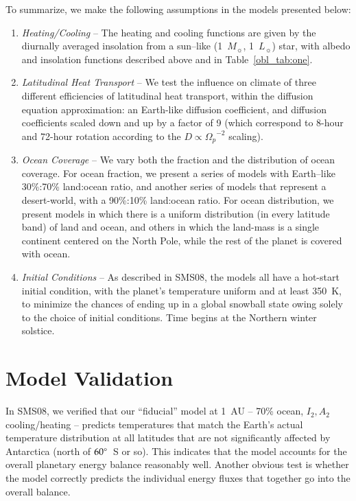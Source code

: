 To summarize, we make the following assumptions in the models
presented below:
\begin{enumerate}
 \item {\it Heating/Cooling} -- The heating and cooling functions are
    given by the diurnally averaged insolation from a sun--like
    (1~$M_\sun$, 1~$L_\sun$) star, with albedo and insolation
    functions described above and in Table~\ref{obl_tab:one}.
 \item {\it Latitudinal Heat Transport} -- We test the influence on
    climate of three different efficiencies of latitudinal heat
    transport, within the diffusion equation approximation: an
    Earth-like diffusion coefficient, and diffusion coefficients
    scaled down and up by a factor of 9 (which correspond to 8-hour
    and 72-hour rotation according to the $D\propto {\Omega_p}^{-2}$
    scaling).
 \item {\it Ocean Coverage} -- We vary both the fraction and the
    distribution of ocean coverage.  For ocean fraction, we present a
    series of models with Earth--like 30\%:70\% land:ocean ratio, and
    another series of models that represent a desert-world, with a
    90\%:10\% land:ocean ratio.  For ocean distribution, we present
    models in which there is a uniform distribution (in every latitude
    band) of land and ocean, and others in which the land-mass is a
    single continent centered on the North Pole, while the rest of the
    planet is covered with ocean.
 \item {\it Initial Conditions} -- As described in SMS08, the models
    all have a hot-start initial condition, with the planet's
    temperature uniform and at least 350~K, to minimize the chances of
    ending up in a global snowball state owing solely to the choice of
    initial conditions.  Time begins at the Northern winter solstice.
\end{enumerate}


\section{Model Validation}
\label{obl_sec:valid}

In SMS08, we verified that our ``fiducial'' model at 1~AU -- 70\%
ocean, $I_2,A_2$ cooling/heating -- predicts temperatures that match
the Earth's actual temperature distribution at all latitudes that are
not significantly affected by Antarctica (north of $60\mbox{$^\circ$}$~S or so).
This indicates that the model accounts for the overall planetary
energy balance reasonably well.  Another obvious test is whether the
model correctly predicts the individual energy fluxes that together go
into the overall balance.

